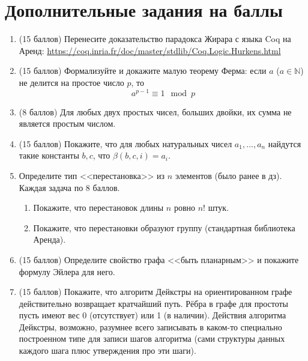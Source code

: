 \documentclass[10pt,a4paper,oneside]{article}
\begin{document}
\section*{Дополнительные задания на баллы}
\begin{enumerate}
\item (15 баллов) Перенесите доказательство парадокса Жирара с языка Coq на Аренд:
\url{https://coq.inria.fr/doc/master/stdlib/Coq.Logic.Hurkens.html}

\item (15 баллов) 
Формализуйте и докажите малую теорему Ферма: если $a$ ($a \in \mathbb{N}$) не делится на простое число $p$,
то $$a^{p-1} \equiv 1 \mod p$$ 

\item (8 баллов) Для любых двух простых чисел, больших двойки, их сумма не является простым числом.

\item (15 баллов) Покажите, что для любых натуральных чисел $a_1,\dots,a_n$ найдутся такие константы $b,c$, что $\beta(b,c,i) = a_i$.

\item Определите тип <<перестановка>> из $n$ элементов (было ранее в дз). Каждая задача по 8 баллов.
\begin{enumerate}
\item Покажите, что перестановок длины $n$ ровно $n!$ штук.
\item Покажите, что перестановки образуют группу (стандартная библиотека Аренда).
\end{enumerate}

\item (15 баллов) Определите свойство графа <<быть планарным>> и покажите формулу Эйлера для него.

\item (15 баллов) Покажите, что алгоритм Дейкстры на ориентированном графе действительно возвращает кратчайший путь. Рёбра в графе для простоты
пусть имеют вес 0 (отсутствует) или 1 (в наличии). Действия алгоритма Дейкстры, возможно, разумнее всего записывать в каком-то специально
построенном типе для записи шагов алгоритма (сами структуры данных каждого шага плюс утверждения про эти шаги).

\end{enumerate}
\end{document}
